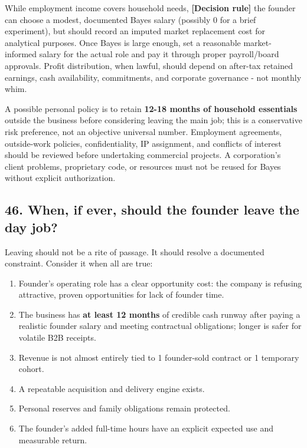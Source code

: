While employment income covers household needs, \textbf{\textbf{[Decision rule]}} the founder can choose a modest, documented Bayes salary (possibly 0 for a brief experiment), but should record an imputed market replacement cost for analytical purposes. Once Bayes is large enough, set a reasonable market-informed salary for the actual role and pay it through proper payroll/\allowbreak board approvals. Profit distribution, when lawful, should depend on after-tax retained earnings, cash availability, commitments, and corporate governance - not monthly whim.

A possible personal policy is to retain \textbf{12-18 months of household essentials} outside the business before considering leaving the main job; this is a conservative risk preference, not an objective universal number. Employment agreements, outside-work policies, confidentiality, IP assignment, and conflicts of interest should be reviewed before undertaking commercial projects. A corporation's client problems, proprietary code, or resources must not be reused for Bayes without explicit authorization.

\subsection{46. When, if ever, should the founder leave the day job?}

Leaving should not be a rite of passage. It should resolve a documented constraint. Consider it when all are true:

\begin{enumerate}[leftmargin=*,itemsep=1.5pt]
  \item Founder's operating role has a clear opportunity cost: the company is refusing attractive, proven opportunities for lack of founder time.
  \item The business has \textbf{at least 12 months} of credible cash runway after paying a realistic founder salary and meeting contractual obligations; longer is safer for volatile B2B receipts.
  \item Revenue is not almost entirely tied to 1 founder-sold contract or 1 temporary cohort.
  \item A repeatable acquisition and delivery engine exists.
  \item Personal reserves and family obligations remain protected.
  \item The founder's added full-time hours have an explicit expected use and measurable return.
\end{enumerate}

